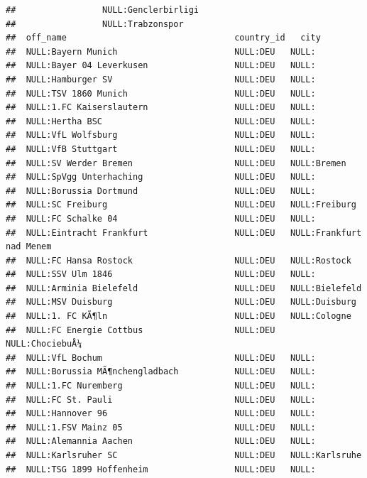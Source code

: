 \documentclass{article}\usepackage[]{graphicx}\usepackage[]{color}
\makeatletter
\newenvironment{kframe}{%
 \def\at@end@of@kframe{}%
 \ifinner\ifhmode%
  \def\at@end@of@kframe{\end{minipage}}%
  \begin{minipage}{\columnwidth}%
 \fi\fi%
 \def\FrameCommand##1{\hskip\@totalleftmargin \hskip-\fboxsep
 \colorbox{shadecolor}{##1}\hskip-\fboxsep
     \hskip-\linewidth \hskip-\@totalleftmargin \hskip\columnwidth}%
 \MakeFramed {\advance\hsize-\width
   \@totalleftmargin\z@ \linewidth\hsize
   \@setminipage}}%
 {\par\unskip\endMakeFramed%
 \at@end@of@kframe}
\newenvironment{knitrout}{}{} %
\makeatother
\begin{document}
\begin{knitrout}
\begin{kframe}
\begin{verbatim}
##                 NULL:Genclerbirligi                            
##                 NULL:Trabzonspor                               
##  off_name                                 country_id   city                    
##  NULL:Bayern Munich                       NULL:DEU   NULL:                     
##  NULL:Bayer 04 Leverkusen                 NULL:DEU   NULL:                     
##  NULL:Hamburger SV                        NULL:DEU   NULL:                     
##  NULL:TSV 1860 Munich                     NULL:DEU   NULL:                     
##  NULL:1.FC Kaiserslautern                 NULL:DEU   NULL:                     
##  NULL:Hertha BSC                          NULL:DEU   NULL:                     
##  NULL:VfL Wolfsburg                       NULL:DEU   NULL:                     
##  NULL:VfB Stuttgart                       NULL:DEU   NULL:                     
##  NULL:SV Werder Bremen                    NULL:DEU   NULL:Bremen               
##  NULL:SpVgg Unterhaching                  NULL:DEU   NULL:                     
##  NULL:Borussia Dortmund                   NULL:DEU   NULL:                     
##  NULL:SC Freiburg                         NULL:DEU   NULL:Freiburg             
##  NULL:FC Schalke 04                       NULL:DEU   NULL:                     
##  NULL:Eintracht Frankfurt                 NULL:DEU   NULL:Frankfurt nad Menem  
##  NULL:FC Hansa Rostock                    NULL:DEU   NULL:Rostock              
##  NULL:SSV Ulm 1846                        NULL:DEU   NULL:                     
##  NULL:Arminia Bielefeld                   NULL:DEU   NULL:Bielefeld            
##  NULL:MSV Duisburg                        NULL:DEU   NULL:Duisburg             
##  NULL:1. FC KÃ¶ln                         NULL:DEU   NULL:Cologne              
##  NULL:FC Energie Cottbus                  NULL:DEU   NULL:ChociebuÅ¼           
##  NULL:VfL Bochum                          NULL:DEU   NULL:                     
##  NULL:Borussia MÃ¶nchengladbach           NULL:DEU   NULL:                     
##  NULL:1.FC Nuremberg                      NULL:DEU   NULL:                     
##  NULL:FC St. Pauli                        NULL:DEU   NULL:                     
##  NULL:Hannover 96                         NULL:DEU   NULL:                     
##  NULL:1.FSV Mainz 05                      NULL:DEU   NULL:                     
##  NULL:Alemannia Aachen                    NULL:DEU   NULL:                     
##  NULL:Karlsruher SC                       NULL:DEU   NULL:Karlsruhe            
##  NULL:TSG 1899 Hoffenheim                 NULL:DEU   NULL:                     

\end{verbatim}
\end{kframe}
\end{knitrout}
\end{document}
